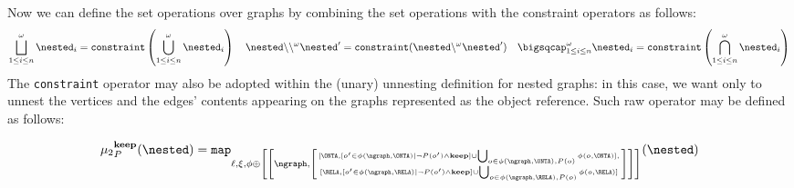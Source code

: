 Now we can define the set operations over graphs by combining the set operations with the constraint operators as follows:
\[\bigsqcup^\omega_{1\leq i\leq n}\nested_i=\texttt{constraint}\left(\bigcup^\omega_{1\leq i\leq n}\nested_i\right)\quad \nested\backslash\backslash^{\omega}\nested' = \texttt{constraint}(\nested\backslash^{\omega}\nested')\quad \bigsqcap^\omega_{1\leq i\leq n}\nested_i=\texttt{constraint}\left(\bigcap^\omega_{1\leq i\leq n}\nested_i\right)\]
The \texttt{constraint} operator may also be adopted within the (unary) unnesting definition for nested graphs: in this case, we want only to unnest the vertices and the edges' contents appearing on the graphs represented as the object reference. Such raw operator may be defined as follows:

\[{\mu_2}_{P}^{\textbf{keep}}(\nested)=\texttt{map}_{\ell,\xi,\phi\oplus \left[\left[\ngraph,\left[\genfrac{}{}{0pt}{}{[\ONTA,[o'\in\phi(\ngraph,\ONTA)|\neg P(o')\wedge \textbf{keep}]\cup\bigcup_{o\in\phi(\ngraph,\ONTA),P(o)}\phi(o,\ONTA)],}{[\RELA,[o'\in\phi(\ngraph,\RELA)|\neg P(o')\wedge \textbf{keep}]\cup\bigcup_{o\in\phi(\ngraph,\RELA),P(o)}\phi(o,\RELA)]}\right]\right]\right]}(\nested)\]



